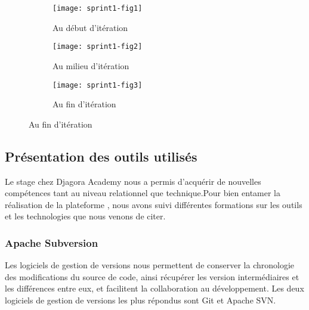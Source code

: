 \begin{figure}[htbp]
    \centering
    \caption{Évolution du travail}
    \begin{subfigure}{1\textwidth}
        \centering
        \texttt{[image: sprint1-fig1]}
        \caption{Au début d'itération}
        \label{fig:sprint1-fig1}
    \end{subfigure}

    \begin{subfigure}{1\textwidth}
        \centering
        \texttt{[image: sprint1-fig2]}
        \caption{Au milieu d'itération}
        \label{fig:sprint1-fig2}
    \end{subfigure}

    \begin{subfigure}{1\textwidth}
        \centering
        \texttt{[image: sprint1-fig3]}
        \caption{Au fin d'itération}
        \label{fig:sprint1-fig3}
    \end{subfigure}
\end{figure}
\clearpage

\subsection{Présentation des outils utilisés}

Le stage chez Djagora Academy nous a permis d'acquérir de nouvelles compétences
tant au niveau relationnel que technique.Pour bien entamer la réalisation de la
plateforme , nous avons suivi différentes formations sur
les outils et les technologies que nous venons de citer.

\subsubsection{Apache Subversion}

Les logiciels de gestion de versions nous permettent de
conserver la chronologie des modifications du source de code, ainsi récupérer
les version intermédiaires et les différences entre eux, et facilitent la
collaboration au développement.
Les deux logiciels de gestion de versions les plus répondus sont Git et Apache
SVN.

